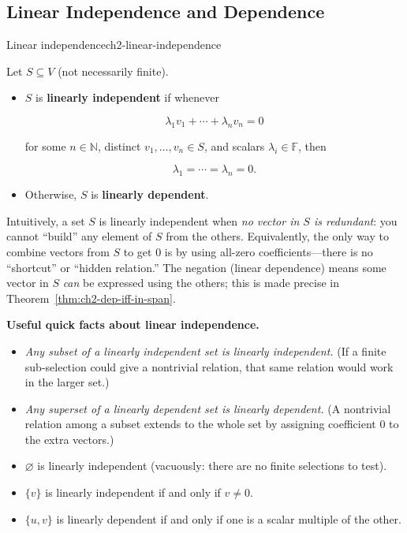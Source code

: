 \subsection{Linear Independence and Dependence}


\begin{definition}{Linear independence}{ch2-linear-independence}

Let $S\subseteq V$ (not necessarily finite).

\begin{itemize}

\item $S$ is \textbf{linearly independent} if whenever

\[
\lambda_1 v_1+\cdots+\lambda_n v_n = 0
\]

for some $n\in\mathbb{N}$, distinct $v_1,\ldots,v_n\in S$, and scalars $\lambda_i\in\mathbb{F}$, then

\[
\lambda_1=\cdots=\lambda_n=0.
\]

\item Otherwise, $S$ is \textbf{linearly dependent}.

\end{itemize}

\end{definition}

Intuitively, a set $S$ is linearly independent when \emph{no vector in $S$ is redundant}: you cannot ``build'' any element of $S$ from the others.
Equivalently, the only way to combine vectors from $S$ to get $0$ is by using all-zero coefficients---there is no ``shortcut'' or ``hidden relation.''
The negation (linear dependence) means some vector in $S$ \emph{can} be expressed using the others; this is made precise in Theorem~\ref{thm:ch2-dep-iff-in-span}.

\begin{policynote}
\textbf{Useful quick facts about linear independence.}
\begin{itemize}[leftmargin=*]
\item \emph{Any subset of a linearly independent set is linearly independent.}  (If a finite sub-selection could give a nontrivial relation, that same relation would work in the larger set.)
\item \emph{Any superset of a linearly dependent set is linearly dependent.}  (A nontrivial relation among a subset extends to the whole set by assigning coefficient $0$ to the extra vectors.)
\item $\varnothing$ is linearly independent (vacuously: there are no finite selections to test).
\item $\{v\}$ is linearly independent if and only if $v\neq 0$.
\item $\{u,v\}$ is linearly dependent if and only if one is a scalar multiple of the other.
\end{itemize}
\end{policynote}

